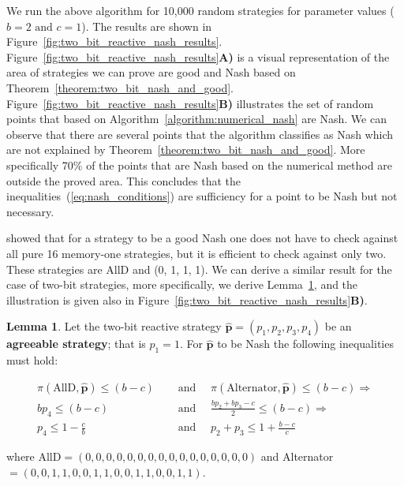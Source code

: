 \documentclass{article}
\theoremstyle{definition}
\newtheorem{lemma}[theorem]{Lemma}
\begin{document}
We run the above algorithm for 10,000 random strategies for
parameter values (\(b=2 \text{ and } c=1\)). The results are shown in
Figure~\ref{fig:two_bit_reactive_nash_results}.
Figure~\ref{fig:two_bit_reactive_nash_results}\textbf{A)} is a visual
representation of the area of strategies we can prove are good and Nash based on
Theorem~\ref{theorem:two_bit_nash_and_good}.
Figure~\ref{fig:two_bit_reactive_nash_results}\textbf{B)} illustrates the set of
random points that based on Algorithm~\ref{algorithm:numerical_nash} are Nash.
We can observe that there are several points that the algorithm classifies as
Nash which are not explained by Theorem~\ref{theorem:two_bit_nash_and_good}.
More specifically 70\% of the points that are Nash based on the numerical method
are outside the proved area. This concludes that the
inequalities~(\ref{eq:nash_conditions}) are sufficiency for a point to be Nash
but not necessary.

\citep{akin:EGADS:2016} showed that for a strategy to be a good Nash one does
not have to check against all pure 16 memory-one strategies, but it is efficient
to check against only two. These strategies are AllD and (0, 1, 1, 1). We can
derive a similar result for the case of two-bit strategies, more specifically,
we derive Lemma~\ref{lemma:nash_from_numerical_results}, and the illustration is
given also in Figure~\ref{fig:two_bit_reactive_nash_results}\textbf{B)}.

\begin{lemma}\label{lemma:nash_from_numerical_results}
Let the two-bit reactive strategy \(\mathbf{\hat{p}} = (p_{1}, p_{2}, p_{3}, p_{4})\) be an \textbf{agreeable
strategy}; that is \(p_1 = 1\). For \(\mathbf{\hat{p}}\) to be Nash the
following inequalities must hold:

\begin{align*}
  \pi(\text{AllD}, \mathbf{\hat{p}}) \leq (b - c) & \quad \text{ and } \quad \pi(\text{Alternator}, \mathbf{\hat{p}}) \leq (b - c) \Rightarrow \\
  b p_4 \leq (b - c) & \quad \text{ and } \quad  \frac{b p_{2} + b p_{3} - c}{2} \leq (b - c) \Rightarrow \\
  p_4 \leq 1 - \frac{c}{b} & \quad \text{ and } \quad  p_2 + p_3 \leq 1 + \frac{b - c}{c}
\end{align*}

where AllD\(=(0, 0, 0, 0, 0, 0, 0, 0, 0, 0, 0, 0, 0, 0, 0, 0)\) and
Alternator\(=(0, 0, 1, 1, 0, 0, 1, 1, 0, 0, 1, 1, 0, 0, 1, 1)\).
\end{lemma}
\end{document}
